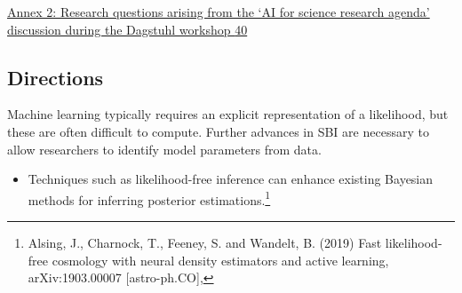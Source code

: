 \protect\hyperlink{_Toc121762051}{Annex 2: Research questions arising
from the `AI for science research agenda' discussion during the Dagstuhl
workshop \protect\hyperlink{_Toc121762051}{40}}

\hypertarget{introduction-bridging-data-driven-and-mechanistic-modelling}{%



{%

\hypertarget{directions}{%
\subsection{Directions}\label{directions}}

Machine learning typically requires an explicit representation of a
likelihood, but these are often difficult to compute. Further advances
in SBI are necessary to allow researchers to identify model parameters
from data.

\begin{itemize}
\item
  Techniques such as likelihood-free inference can enhance existing
  Bayesian methods for inferring posterior estimations.\footnote{Alsing,
    J., Charnock, T., Feeney, S. and Wandelt, B. (2019) Fast
    likelihood-free cosmology with neural density estimators and active
    learning, arXiv:1903.00007 {[}astro-ph.CO{]},

}
\end{itemize}}}
